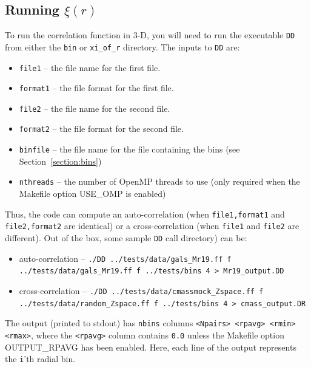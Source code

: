 \documentclass[12pt,titlepage]{article}
\newcommand{\xir}{\ensuremath{{\xi(r)}}\xspace}
\begin{document}
\subsection{Running \texorpdfstring{\xir}{xi(r)}}
To run the correlation function in 3-D, you will need to run the executable \texttt{DD} from either the \texttt{bin} or \texttt{xi\_of\_r} directory. The inputs 
to \texttt{DD} are:
\begin{itemize}
\item \texttt{file1}   -- the file name for the first file.
\item \texttt{format1} -- the file format for the first file.
\item \texttt{file2}   -- the file name for the second file.
\item \texttt{format2} -- the file format for the second file.
\item \texttt{binfile} -- the file name for the file containing the bins (see Section~\ref{section:bins})
\item \texttt{nthreads} -- the number of OpenMP threads to use (only required when the Makefile option USE\_OMP is enabled)
\end{itemize}
Thus, the code can compute an auto-correlation (when \texttt{file1,format1} and \texttt{file2,format2} are identical) or a cross-correlation (when \texttt{file1} and \texttt{file2} are different). Out of the box, 
some sample \texttt{DD} call directory) can be:
\begin{itemize}
\item auto-correlation --  {\scriptsize \texttt{./DD  ../tests/data/gals\_Mr19.ff f ../tests/data/gals\_Mr19.ff f ../tests/bins 4 > Mr19\_output.DD}}
\item cross-correlation -- {\scriptsize \texttt{./DD ../tests/data/cmassmock\_Zspace.ff f ../tests/data/random\_Zspace.ff f ../tests/bins 4 > cmass\_output.DR}}
\end{itemize}
The output (printed to stdout) has \texttt{nbins} columns \texttt{<Npairs> <rpavg> <rmin> <rmax>}, where the \texttt{<rpavg>} column contains \texttt{0.0} unless the 
Makefile option OUTPUT\_RPAVG has been enabled. Here, each line of the output represents the \texttt{i}'th radial bin. 
\end{document}
